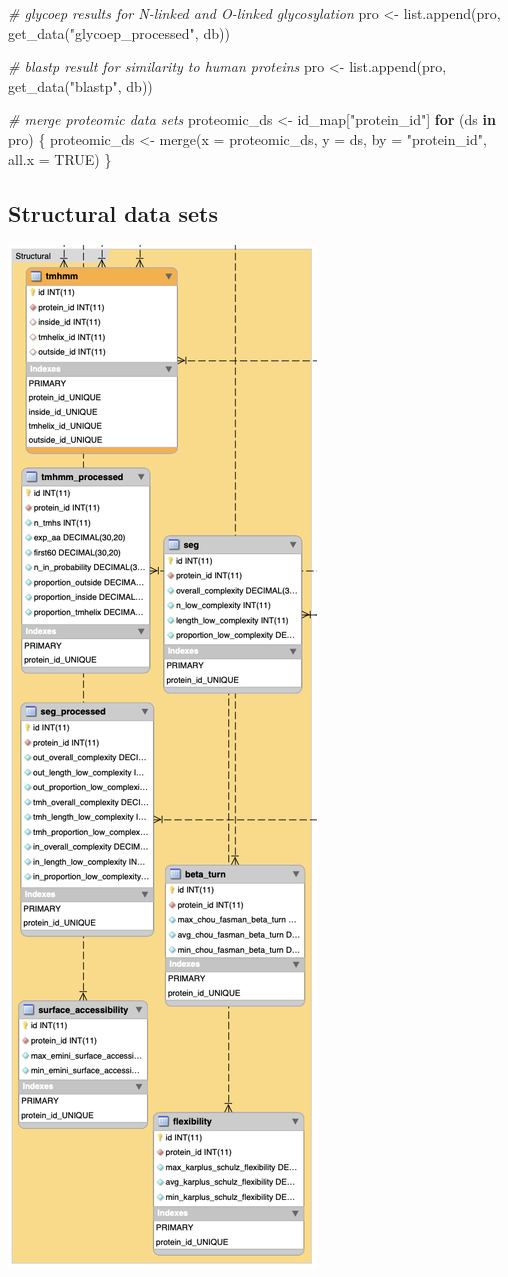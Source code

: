 \documentclass[
  11pt,
  oneside]{book}
\newenvironment{Shaded}{\begin{snugshade}}{\end{snugshade}}
\newcommand{\AttributeTok}[1]{\textcolor[rgb]{0.77,0.63,0.00}{#1}}
\newcommand{\CommentTok}[1]{\textcolor[rgb]{0.56,0.35,0.01}{\textit{#1}}}
\newcommand{\ConstantTok}[1]{\textcolor[rgb]{0.00,0.00,0.00}{#1}}
\newcommand{\ControlFlowTok}[1]{\textcolor[rgb]{0.13,0.29,0.53}{\textbf{#1}}}
\newcommand{\FunctionTok}[1]{\textcolor[rgb]{0.00,0.00,0.00}{#1}}
\newcommand{\NormalTok}[1]{#1}
\newcommand{\OtherTok}[1]{\textcolor[rgb]{0.56,0.35,0.01}{#1}}
\newcommand{\StringTok}[1]{\textcolor[rgb]{0.31,0.60,0.02}{#1}}
\begin{document}
\begin{Shaded}
\begin{Highlighting}[]
\CommentTok{\# glycoep results for N{-}linked and O{-}linked glycosylation}
\NormalTok{pro }\OtherTok{\textless{}{-}} \FunctionTok{list.append}\NormalTok{(pro, }\FunctionTok{get\_data}\NormalTok{(}\StringTok{"glycoep\_processed"}\NormalTok{, db))}

\CommentTok{\# blastp result for similarity to human proteins}
\NormalTok{pro }\OtherTok{\textless{}{-}} \FunctionTok{list.append}\NormalTok{(pro, }\FunctionTok{get\_data}\NormalTok{(}\StringTok{"blastp"}\NormalTok{, db))}

\CommentTok{\# merge proteomic data sets}
\NormalTok{proteomic\_ds }\OtherTok{\textless{}{-}}\NormalTok{ id\_map[}\StringTok{"protein\_id"}\NormalTok{]}
\ControlFlowTok{for}\NormalTok{ (ds }\ControlFlowTok{in}\NormalTok{ pro) \{}
\NormalTok{  proteomic\_ds }\OtherTok{\textless{}{-}} \FunctionTok{merge}\NormalTok{(}\AttributeTok{x =}\NormalTok{ proteomic\_ds, }\AttributeTok{y =}\NormalTok{ ds, }\AttributeTok{by =} \StringTok{"protein\_id"}\NormalTok{, }\AttributeTok{all.x =} \ConstantTok{TRUE}\NormalTok{)}
\NormalTok{\}}
\end{Highlighting}
\end{Shaded}

\hypertarget{structural-data-sets}{%
\subsection{Structural data sets}\label{structural-data-sets}}

\begin{center}\includegraphics[width=0.25\linewidth]{./figures/Supplementary Fig 1 structural data} \end{center}
\end{document}
